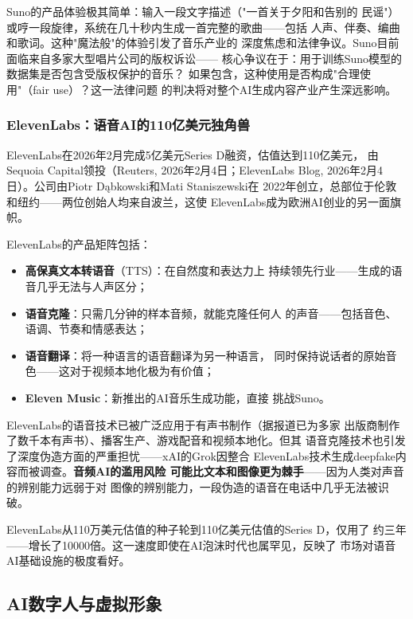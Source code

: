 Suno的产品体验极其简单：输入一段文字描述（"一首关于夕阳和告别的
民谣"）或哼一段旋律，系统在几十秒内生成一首完整的歌曲——包括
人声、伴奏、编曲和歌词。这种"魔法般"的体验引发了音乐产业的
深度焦虑和法律争议。Suno目前面临来自多家大型唱片公司的版权诉讼——
核心争议在于：用于训练Suno模型的数据集是否包含受版权保护的音乐？
如果包含，这种使用是否构成"合理使用"（fair use）？这一法律问题
的判决将对整个AI生成内容产业产生深远影响。

\subsubsection{ElevenLabs：语音AI的110亿美元独角兽}
ElevenLabs在2026年2月完成5亿美元Series D融资，估值达到110亿美元，
由Sequoia Capital领投（Reuters, 2026年2月4日；ElevenLabs Blog,
2026年2月4日）。公司由Piotr D\k{a}bkowski和Mati Staniszewski在
2022年创立，总部位于伦敦和纽约——两位创始人均来自波兰，这使
ElevenLabs成为欧洲AI创业的另一面旗帜。

ElevenLabs的产品矩阵包括：
\begin{itemize}
  \item \textbf{高保真文本转语音}（TTS）：在自然度和表达力上
    持续领先行业——生成的语音几乎无法与人声区分；
  \item \textbf{语音克隆}：只需几分钟的样本音频，就能克隆任何人
    的声音——包括音色、语调、节奏和情感表达；
  \item \textbf{语音翻译}：将一种语言的语音翻译为另一种语言，
    同时保持说话者的原始音色——这对于视频本地化极为有价值；
  \item \textbf{Eleven Music}：新推出的AI音乐生成功能，直接
    挑战Suno。
\end{itemize}

ElevenLabs的语音技术已被广泛应用于有声书制作（据报道已为多家
出版商制作了数千本有声书）、播客生产、游戏配音和视频本地化。但其
语音克隆技术也引发了深度伪造方面的严重担忧——xAI的Grok因整合
ElevenLabs技术生成deepfake内容而被调查。\textbf{音频AI的滥用风险
可能比文本和图像更为棘手}——因为人类对声音的辨别能力远弱于对
图像的辨别能力，一段伪造的语音在电话中几乎无法被识破。

ElevenLabs从110万美元估值的种子轮到110亿美元估值的Series D，仅用了
约三年——增长了10000倍。这一速度即使在AI泡沫时代也属罕见，反映了
市场对语音AI基础设施的极度看好。

\subsection{AI数字人与虚拟形象}
\label{subsec:avatar}

